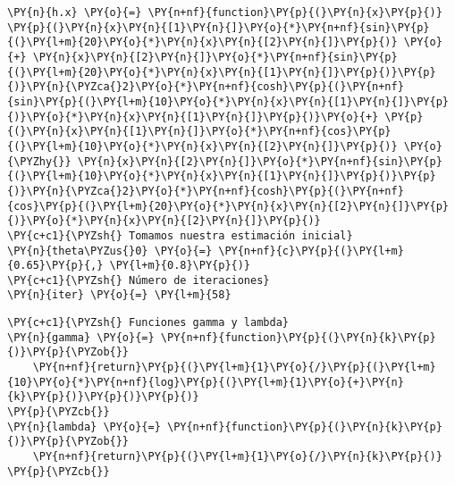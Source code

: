 \vspace*{2mm}
 \begin{tcolorbox}[breakable, size=fbox, boxrule=1pt, pad at break*=1mm,colback=cellbackground, colframe=cellborder]
\begin{Verbatim}[commandchars=\\\{\}]
\PY{n}{h.x} \PY{o}{=} \PY{n+nf}{function}\PY{p}{(}\PY{n}{x}\PY{p}{)}  \PY{p}{(}\PY{n}{x}\PY{n}{[1}\PY{n}{]}\PY{o}{*}\PY{n+nf}{sin}\PY{p}{(}\PY{l+m}{20}\PY{o}{*}\PY{n}{x}\PY{n}{[2}\PY{n}{]}\PY{p}{)} \PY{o}{+} \PY{n}{x}\PY{n}{[2}\PY{n}{]}\PY{o}{*}\PY{n+nf}{sin}\PY{p}{(}\PY{l+m}{20}\PY{o}{*}\PY{n}{x}\PY{n}{[1}\PY{n}{]}\PY{p}{)}\PY{p}{)}\PY{n}{\PYZca{}2}\PY{o}{*}\PY{n+nf}{cosh}\PY{p}{(}\PY{n+nf}{sin}\PY{p}{(}\PY{l+m}{10}\PY{o}{*}\PY{n}{x}\PY{n}{[1}\PY{n}{]}\PY{p}{)}\PY{o}{*}\PY{n}{x}\PY{n}{[1}\PY{n}{]}\PY{p}{)}\PY{o}{+} \PY{p}{(}\PY{n}{x}\PY{n}{[1}\PY{n}{]}\PY{o}{*}\PY{n+nf}{cos}\PY{p}{(}\PY{l+m}{10}\PY{o}{*}\PY{n}{x}\PY{n}{[2}\PY{n}{]}\PY{p}{)} \PY{o}{\PYZhy{}} \PY{n}{x}\PY{n}{[2}\PY{n}{]}\PY{o}{*}\PY{n+nf}{sin}\PY{p}{(}\PY{l+m}{10}\PY{o}{*}\PY{n}{x}\PY{n}{[1}\PY{n}{]}\PY{p}{)}\PY{p}{)}\PY{n}{\PYZca{}2}\PY{o}{*}\PY{n+nf}{cosh}\PY{p}{(}\PY{n+nf}{cos}\PY{p}{(}\PY{l+m}{20}\PY{o}{*}\PY{n}{x}\PY{n}{[2}\PY{n}{]}\PY{p}{)}\PY{o}{*}\PY{n}{x}\PY{n}{[2}\PY{n}{]}\PY{p}{)}
\PY{c+c1}{\PYZsh{} Tomamos nuestra estimación inicial}
\PY{n}{theta\PYZus{}0} \PY{o}{=} \PY{n+nf}{c}\PY{p}{(}\PY{l+m}{0.65}\PY{p}{,} \PY{l+m}{0.8}\PY{p}{)}
\PY{c+c1}{\PYZsh{} Número de iteraciones}
\PY{n}{iter} \PY{o}{=} \PY{l+m}{58}
\end{Verbatim}
\end{tcolorbox}

    \begin{tcolorbox}[breakable, size=fbox, boxrule=1pt, pad at break*=1mm,colback=cellbackground, colframe=cellborder]
\begin{Verbatim}[commandchars=\\\{\}]
\PY{c+c1}{\PYZsh{} Funciones gamma y lambda}
\PY{n}{gamma} \PY{o}{=} \PY{n+nf}{function}\PY{p}{(}\PY{n}{k}\PY{p}{)}\PY{p}{\PYZob{}}
    \PY{n+nf}{return}\PY{p}{(}\PY{l+m}{1}\PY{o}{/}\PY{p}{(}\PY{l+m}{10}\PY{o}{*}\PY{n+nf}{log}\PY{p}{(}\PY{l+m}{1}\PY{o}{+}\PY{n}{k}\PY{p}{)}\PY{p}{)}\PY{p}{)}
\PY{p}{\PYZcb{}}
\PY{n}{lambda} \PY{o}{=} \PY{n+nf}{function}\PY{p}{(}\PY{n}{k}\PY{p}{)}\PY{p}{\PYZob{}}
    \PY{n+nf}{return}\PY{p}{(}\PY{l+m}{1}\PY{o}{/}\PY{n}{k}\PY{p}{)}
\PY{p}{\PYZcb{}}
\end{Verbatim}
\end{tcolorbox}

